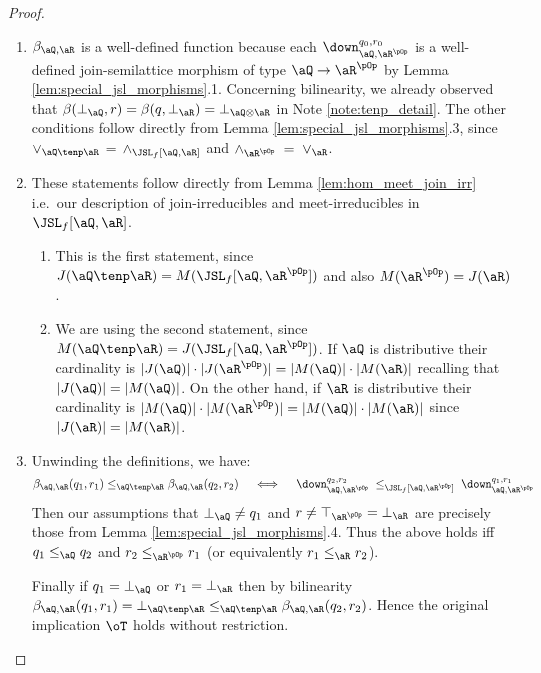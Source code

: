 \documentclass{article}
\begin{document}
\begin{proof}
\item
\begin{enumerate}
\item
$\beta_{\aQ,\aR}$ is a well-defined function because each $\down_{\aQ,\aR^{\pOp}}^{q_0,r_0}$ is a well-defined join-semilattice morphism of type $\aQ \to \aR^{\pOp}$ by Lemma \ref{lem:special_jsl_morphisms}.1. Concerning bilinearity, we already observed that $\beta(\bot_\aQ,r) = \beta(q,\bot_\aR) = \bot_{\aQ \otimes \aR}$ in Note \ref{note:tenp_detail}. The other conditions follow directly from Lemma \ref{lem:special_jsl_morphisms}.3, since $\lor_{\aQ \tenp \aR} \, = \, \land_{\JSL_f[\aQ,\aR]}$ and $\land_{\aR^{\pOp}} \; = \; \lor_\aR$.

\item
These statements follow directly from Lemma \ref{lem:hom_meet_join_irr} i.e.\ our description of join-irreducibles and meet-irreducibles in $\JSL_f[\aQ,\aR]$. 

\begin{enumerate}
\item
This is the first statement, since $J(\aQ \tenp \aR) = M(\JSL_f[\aQ,\aR^{\pOp}])$ and also  $M(\aR^{\pOp}) = J(\aR)$.
\item
We are using the second statement, since $M(\aQ \tenp \aR) = J(\JSL_f[\aQ,\aR^{\pOp}])$. If $\aQ$ is distributive their cardinality is $|J(\aQ)| \cdot |J(\aR^{\pOp})| = |M(\aQ)| \cdot |M(\aR)|$ recalling that $|J(\aQ)| = |M(\aQ)|$. On the other hand, if $\aR$ is distributive their cardinality is $|M(\aQ)| \cdot |M(\aR^{\pOp})| = |M(\aQ)| \cdot |M(\aR)|$ since $|J(\aR)| = |M(\aR)|$.
\end{enumerate}

\item
Unwinding the definitions, we have:
\[
\beta_{\aQ,\aR}(q_1,r_1) \leq_{\aQ \tenp \aR} \beta_{\aQ,\aR}(q_2,r_2)
\quad\iff\quad
\down_{\aQ,\aR^{\pOp}}^{q_2,r_2} \; \leq_{\JSL_f[\aQ,\aR^{\pOp}]} \; \down_{\aQ,\aR^{\pOp}}^{q_1,r_1}
\]
Then our assumptions that $\bot_\aQ \neq q_1$ and $r \neq \top_{\aR^{\pOp}} = \bot_\aR$ are precisely those from Lemma \ref{lem:special_jsl_morphisms}.4. Thus the above holds iff $q_1 \leq_\aQ q_2$ and $r_2 \leq_{\aR^{\pOp}} r_1$ (or equivalently $r_1 \leq_\aR r_2$).

Finally if $q_1 = \bot_\aQ$ or $r_1 = \bot_\aR$ then by bilinearity $\beta_{\aQ,\aR}(q_1,r_1) = \bot_{\aQ \tenp \aR} \leq_{\aQ \tenp \aR} \beta_{\aQ,\aR}(q_2,r_2)$. Hence the original implication $\oT$ holds without restriction.



\end{enumerate}
\end{proof}
\end{document}
